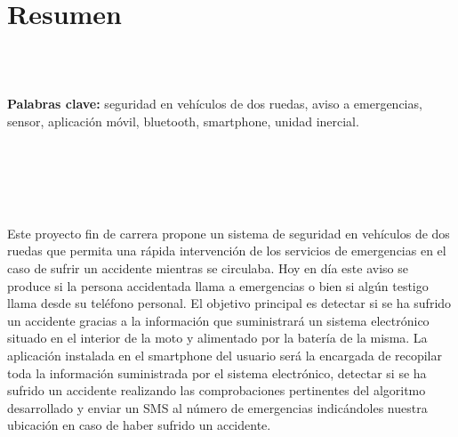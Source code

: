 	\chapter*{Resumen} %
	
	\
	\\
	\
	
	\textbf{Palabras clave:} seguridad en vehículos de dos ruedas, aviso a emergencias, sensor, aplicación móvil, bluetooth, smartphone, unidad inercial.
	
	\
	\\
	\\
	\\
	\
	
	
	Este proyecto fin de carrera propone un sistema de seguridad en vehículos de dos ruedas que permita una rápida intervención de los servicios de emergencias en el caso de sufrir un accidente mientras se circulaba. Hoy en día este aviso se produce si la persona accidentada llama a emergencias o bien si algún testigo llama desde su teléfono personal. El objetivo principal es detectar si se ha sufrido un accidente gracias a la información que suministrará un sistema electrónico situado en el interior de la moto y alimentado por la batería de la misma. La aplicación instalada en el smartphone del usuario será la encargada de recopilar toda la información suministrada por el sistema electrónico, detectar si se ha sufrido un accidente realizando las comprobaciones pertinentes del algoritmo desarrollado y enviar un SMS al número de emergencias indicándoles nuestra ubicación en caso de haber sufrido un accidente.
	

	


	\newpage
	$\ $